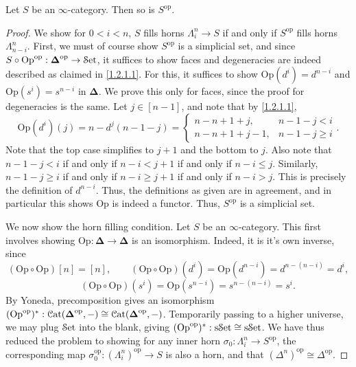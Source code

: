 \begin{claim}\label{1.2.1.2}
	Let $S$ be an $\infty $-category. Then so is $S^{\mathrm{op}} $.
\end{claim}
\begin{proof}
	We show for $0<i<n$, $S$ fills horns $\Lambda_i^n \to S$ if and only if $S^{\mathrm{op}} $ fills horns $\Lambda_{n-i}^n$. First, we must of course show $S^{\mathrm{op}} $ is a simplicial set, and since $S\circ \mathrm{Op}^{\mathrm{op}}  : \boldsymbol{\Delta} ^{\mathrm{op}}  \to \mathcal{S}\mathrm{et} $, it suffices to show faces and degeneracies are indeed described as claimed in \cref{1.2.1.1}. For this, it suffices to show $\mathrm{Op} (d^i)=d^{n-i} $ and $\mathrm{Op} (s^i)=s^{n-i} $ in $\boldsymbol{\Delta} $. We prove this only for faces, since the proof for degeneracies is the same. Let $j\in [n-1]$, and note that by \cref{1.2.1.1},
	\[
		\mathrm{Op} (d^i)(j)=n-d^j(n-1-j)=
		\begin{cases}
			n-n+1+j,&n-1-j<i\\
			n-n+1+j-1,&n-1-j\geq i
		\end{cases}
	.\]
	Note that the top case simplifies to $j+1$ and the bottom to $j$. Also note that $n-1-j<i$ if and only if $n-i<j+1$ if and only if $n-i\leq j$. Similarly, $n-1-j \geq i$ if and only if $n-i \geq j+1$ if and only if $n-i > j$. This is precisely the definition of $d^{n-i} $. Thus, the definitions as given are in agreement, and in particular this shows $\mathrm{Op} $ is indeed a functor. Thus, $S^{\mathrm{op}} $ is a simplicial set.

	We now show the horn filling condition. Let $S$ be an $\infty $-category. This first involves showing $\mathrm{Op} : \boldsymbol{\Delta}  \to \boldsymbol{\Delta} $ is an isomorphism. Indeed, it is it's own inverse, since
	\[
	(\mathrm{Op} \circ \mathrm{Op} )[n]=[n],\qquad (\mathrm{Op} \circ \mathrm{Op} )(d^i)=\mathrm{Op} (d^{n-i} )=d^{n-(n-i)} =d^i,\]
\[
	\qquad (\mathrm{Op} \circ \mathrm{Op} )(s^i)=\mathrm{Op} (s^{n-i} )=s^{n-(n-i)} =s^{i} 
	.\]
	By Yoneda, precomposition gives an isomorphism $(\mathrm{Op} ^{\mathrm{op}}  )^* : \mathcal{C}\mathrm{at} (\boldsymbol{\Delta} ^{\mathrm{op}} ,-)\cong \mathcal{C}\mathrm{at} (\boldsymbol{\Delta} ^{\mathrm{op}} ,-)$. Temporarily passing to a higher universe, we may plug $\mathcal{S}\mathrm{et} $ into the blank, giving $(\mathrm{Op} ^{\mathrm{op}} )^* : \mathrm{s}\mathcal{S}\mathrm{et} \cong \mathrm{s}\mathcal{S}\mathrm{et} $. We have thus reduced the problem to showing for any inner horn $\sigma_0 : \Lambda_i^n \to S^{\mathrm{op}} $, the corresponding map $\sigma_0^{\mathrm{op}} : (\Lambda_i^n)^{\mathrm{op}} \to S$ is also a horn, and that $(\Delta^n)^{\mathrm{op}} \cong\Delta^{\mathrm{op}} $.


\end{proof}
